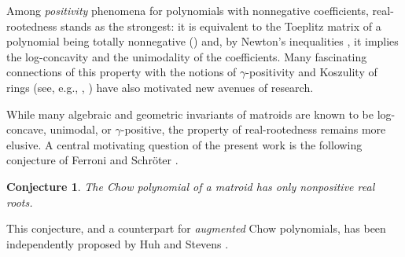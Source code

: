 \documentclass[11pt,a4paper]{amsart}
\theoremstyle{results}
\theoremstyle{definitions}
\newtheorem{conjecture}[thm]{Conjecture}
\begin{document}
Among \emph{positivity} phenomena for polynomials with nonnegative coefficients, real-rootedness stands as the strongest: it is equivalent to the Toeplitz matrix of a polynomial being totally nonnegative (\cite[Theorem~1.3]{branden2015unimodality}) and, by Newton’s inequalities \cite[Theorem~2]{stanley-unimodality}, it implies the log-concavity and the unimodality of the coefficients. Many fascinating connections of this property with the notions of $\gamma$-positivity and Koszulity of rings (see, e.g., \cite[Section~4]{reiner-welker}, \cite[Section~5.4]{ferroni-matherne-stevens-vecchi}) have also motivated new avenues of research.

While many algebraic and geometric invariants of matroids are known to be log-concave, unimodal, or $\gamma$-positive, the property of real-rootedness remains more elusive. A central motivating question of the present work is the following conjecture of Ferroni and Schröter \cite[Conjecture~8.18]{ferroni-schroter}.

\begin{conjecture}\label{conj:real-rootedness-chow}
    The Chow polynomial of a matroid has only nonpositive real roots.
\end{conjecture}

This conjecture, and a counterpart for \emph{augmented} Chow polynomials, has been independently proposed by Huh and Stevens \cite[Conjecture~4.3.3]{stevens-bachelor}. 
\end{document}

